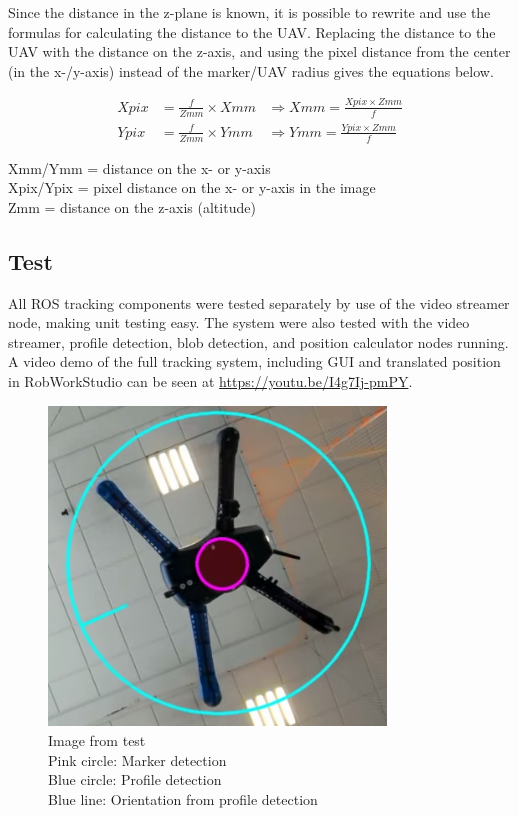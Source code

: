 Since the distance in the z-plane is known, it is possible to rewrite and use the formulas for calculating the distance to the UAV. Replacing the distance to the UAV with the distance on the z-axis, and using the pixel distance from the center (in the x-/y-axis) instead of the marker/UAV radius gives the equations below.

\begin{align}
X\mathit{pix}&= \frac{f}{Z\mathit{mm}}\times X\mathit{mm} &\Rightarrow X\mathit{mm}=\frac{X\mathit{pix}\times Z\mathit{mm}}{f}\nonumber\\
Y\mathit{pix}&= \frac{f}{Z\mathit{mm}}\times Y\mathit{mm} &\Rightarrow Ymm=\frac{Ypix\times Zmm}{f}\nonumber
\end{align}
\begin{center}
	Xmm/Ymm = distance on the x- or y-axis\\
	Xpix/Ypix = pixel distance on the x- or y-axis in the image\\
	Zmm = distance on the z-axis (altitude)
\end{center}
\subsection{Test}
All ROS tracking components were tested separately by use of the video streamer node, making unit testing easy. The system were also tested with the video streamer, profile detection, blob detection, and position calculator nodes running. A video demo of the full tracking system, including GUI and translated position in RobWorkStudio can be seen at \url{https://youtu.be/I4g7Ij-pmPY}.
\begin{figure}
	\centering
	\includegraphics[width=0.8\textwidth]{imgs/tracking-test-indoors}\\
	Image from test\\Pink circle: Marker detection\\
	Blue circle: Profile detection\\Blue line: Orientation from profile detection
\end{figure}
